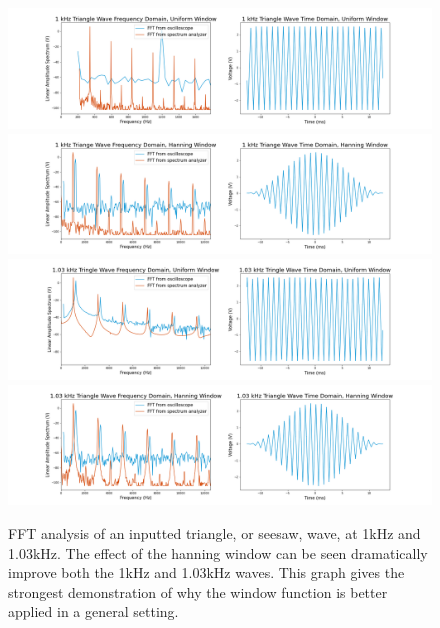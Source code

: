 \documentclass[12pt]{article}
\begin{document}
\begin{figure}[!ht]
    \centering
    \includegraphics[width=\textwidth]{1 kHz Triangle Wave (uniform)}
    \includegraphics[width=\textwidth]{1 kHz Triange Wave (hanning)}
    \includegraphics[width=\textwidth]{1_03 kHz Tringle Wave (uniform)}
    \includegraphics[width=\textwidth]{1_03 kHz Triangle Wave (hanning)}
    \caption{FFT analysis of an inputted triangle, or seesaw, wave, at 1kHz and 1.03kHz. The effect of the hanning window can be seen dramatically improve both the 1kHz and 1.03kHz waves. This graph gives the strongest demonstration of why the window function is better applied in a general setting.}
    \label{fig:triangle}
\end{figure} %
\end{document}
